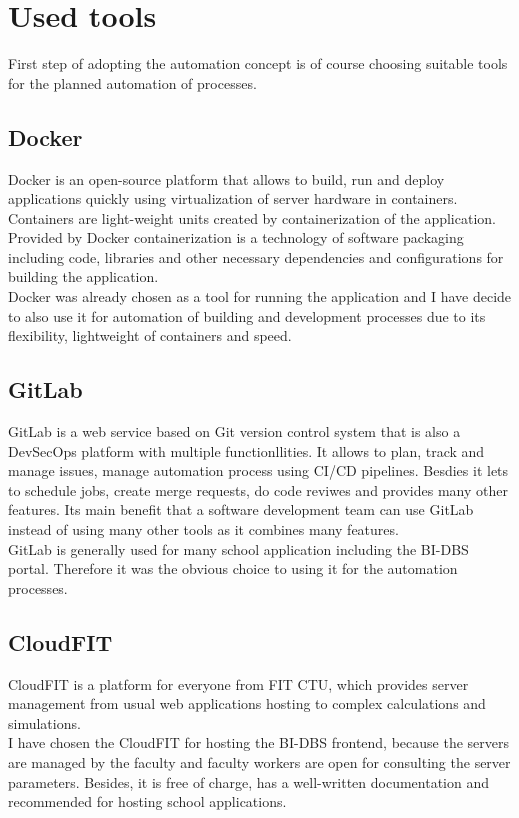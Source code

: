 \section{Used tools} First step of adopting the automation concept is of course choosing suitable tools for the planned automation of processes.

\subsection{Docker} Docker is an open-source platform that allows to build, run and deploy applications quickly using virtualization of server hardware in containers. Containers are light-weight units created by containerization of the application. Provided by Docker containerization is a technology of software packaging including code, libraries and other necessary dependencies and configurations for building the application.\\
Docker was already chosen as a tool for running the application and I have decide to also use it for automation of building and development processes due to its flexibility, lightweight of containers and speed.

\subsection{GitLab} GitLab is a web service based on Git version control system that is also a DevSecOps platform with multiple functionllities. It allows to plan, track and manage issues, manage automation process using CI/CD pipelines. Besdies it lets to schedule jobs, create merge requests, do code reviwes and provides many other features. Its main benefit that a software development team can use GitLab instead of using many other tools as it combines many features.\\
GitLab is generally used for many school application including the BI-DBS portal. Therefore it was the obvious choice to using it for the automation processes.

\subsection{CloudFIT} CloudFIT is a platform for everyone from FIT CTU, which provides server management from usual web applications hosting to complex calculations and simulations.\\
I have chosen the CloudFIT for hosting the BI-DBS frontend, because the servers are managed by the faculty and faculty workers are open for consulting the server parameters. Besides, it is free of charge, has a well-written documentation and recommended for hosting school applications. 

